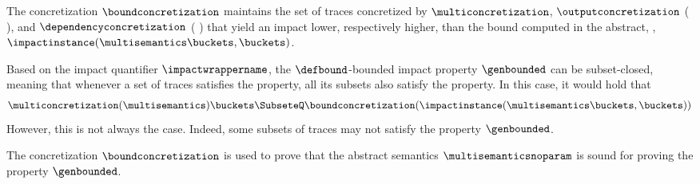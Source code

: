 
The concretization $\boundconcretization$ maintains the set of traces concretized by $\multiconcretization$, $\outputconcretization$ (\cf{} ), and $\dependencyconcretization$ (\cf{} ) that yield an impact lower, respectively higher, than the bound computed in the abstract, \cf, $\impactinstance(\multisemantics\buckets, \buckets)$.

\begin{remark}
  Based on the impact quantifier $\impactwrappername$, the $\defbound$-bounded impact property $\genbounded$ can be subset-closed, meaning that whenever a set of traces satisfies the property, all its subsets also satisfy the property.
In this case, it would hold that
\begin{align*}
  \multiconcretization(\multisemantics)\buckets
  \SubseteQ \boundconcretization(\impactinstance(\multisemantics\buckets, \buckets))
\end{align*}
However, this is not always the case.
Indeed, some subsets of traces may not satisfy the property $\genbounded$.
\end{remark}


The concretization $\boundconcretization$ is used to prove that the abstract semantics $\multisemanticsnoparam$ is sound for proving the property $\genbounded$.


